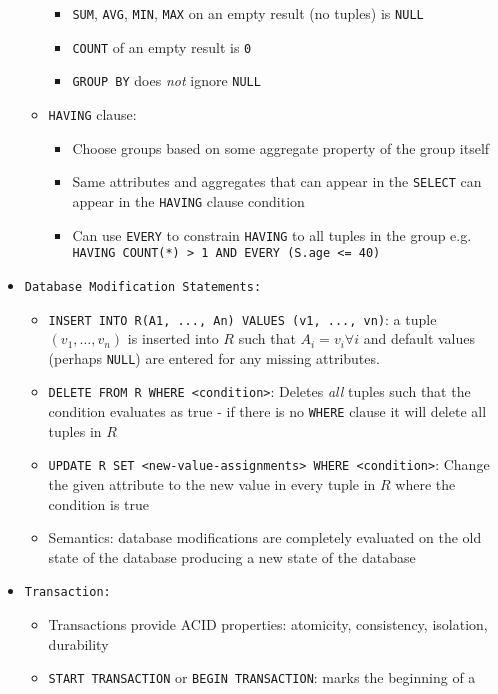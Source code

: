\documentclass[landscape,8pt]{extarticle}
\newcommand{\code}{\lstinline}
\begin{document}
\begin{multicols}{4}
\begin{itemize}
\begin{itemize}
\begin{itemize}
        \item \code{SUM}, \code{AVG}, \code{MIN}, \code{MAX} on an empty result (no tuples) is \code{NULL}
        \item \code{COUNT} of an empty result is \code{0}
        \item \code{GROUP BY} does \emph{not} ignore \code{NULL}
    \end{itemize}
    \item \code{HAVING} clause:
    \begin{itemize}
        \item Choose groups based on some aggregate property of the group itself
        \item Same attributes and aggregates that can appear in the \code{SELECT} can appear in the
        \code{HAVING} clause condition
        \item Can use \code{EVERY} to constrain \code{HAVING} to all tuples in the group e.g. \code{HAVING COUNT(*) > 1 AND EVERY (S.age <= 40)}
    \end{itemize}
\end{itemize}
\item \code{Database Modification Statements:}
\begin{itemize}
    \item \code{INSERT INTO R(A1, ..., An) VALUES (v1, ..., vn)}: a tuple $(v_1, \ldots, v_n)$ is
    inserted into $R$ such that $A_i = v_i \forall i$ and default values (perhaps \code{NULL}) are
    entered for any missing attributes.
    \item \code{DELETE FROM R WHERE <condition>}: Deletes \emph{all} tuples such that the condition
    evaluates as true - if there is no \code{WHERE} clause it will delete all tuples in $R$
    \item \code{UPDATE R SET <new-value-assignments> WHERE <condition>}: Change the given attribute
    to the new value in every tuple in $R$ where the condition is true
    \item Semantics: database modifications are completely evaluated on the old state of the
    database producing a new state of the database
\end{itemize}
\item \code{Transaction:}
\begin{itemize}
    \item Transactions provide ACID properties: atomicity, consistency, isolation, durability
    \item \code{START TRANSACTION} or \code{BEGIN TRANSACTION}: marks the beginning of a

\end{itemize}
\end{itemize}
\end{multicols}
\end{document}
